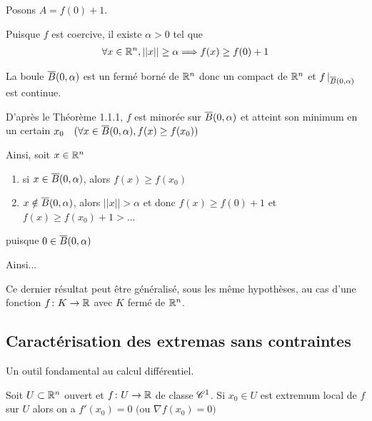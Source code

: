 \documentclass[french,a4paper,10pt]{article}
\begin{document}
	\begin{myproof}
		Posons $A=f(0)+1$.
		
		Puisque $f$ est coercive, il existe $\alpha>0$ tel que
			\[\begin{aligned}
				\forall x\in\mathbb{R}^n,||x||\ge\alpha\Longrightarrow f(x)\ge f(0)+1
			\end{aligned}\]
		
		La boule $\overline{B}(0, \alpha)$ est un fermé borné de $\mathbb{R}^n$ donc un compact de $\mathbb{R}^n$ et $f\mathop{}\!|_{\overline{B}(0, \alpha)}$ est continue.
		
		D'après le Théorème 1.1.1, $f$ est minorée sur $\overline{B}(0, \alpha)$ et atteint son minimum en un certain $x_0\quad(\forall x\in \overline{B}(0, \alpha), f(x)\ge f(x_0))$
		
		Ainsi, soit $x\in \mathbb{R}^n$
		\begin{enumerate}[label=$a\\$]
			\item si $x\in \overline{B}(0, \alpha)$, alors $f(x)\ge f(x_0)$
			\item $x\notin \overline{B}(0, \alpha)$, alors $||x||>\alpha$ et donc $f(x)\ge f(0)+1$ et $f(x)\ge f(x_0)+1>$...
		\end{enumerate}
	
		puisque $0\in \overline{B}(0, \alpha)$
		
		Ainsi...
		
	\end{myproof}

	\begin{remark}
		Ce dernier résultat peut être généralisé, sous les même hypothèses, au cas d'une fonction $f\colon K\to\mathbb{R}$ avec $K$ fermé de $\mathbb{R}^n$.
		
	\end{remark}

	\subsection{Caractérisation des extremas sans contraintes}
	
	Un outil fondamental au calcul différentiel.
	
	\begin{theorem}
		Soit $U\subset \mathbb{R}^n$ ouvert et $f\colon U\to\mathbb{R}$ de classe $\mathscr{C}^1$. Si $x_0\in U$ est extremum local de $f$ sur $U$ alors on a $f'(x_0)=0$ $($ou $\nabla f(x_0)=0)$
		
	\end{theorem}
\end{document}
